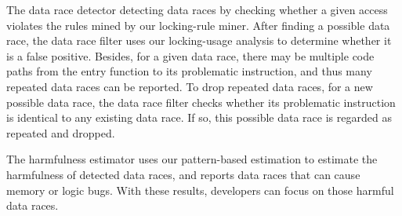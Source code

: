  The data race 
detector detecting data races by checking whether a given access violates the 
rules mined by our locking-rule miner. After finding a possible data race, the 
data race filter uses our locking-usage analysis to determine whether it is a 
false positive. Besides, for a given data race, there may be multiple code 
paths from the entry function to its problematic instruction, and thus many 
repeated data races can be reported. To drop repeated data races, for a new 
possible data race, the data race filter checks whether its problematic 
instruction is identical to any existing data race. If so, this possible data 
race is regarded as repeated and dropped.

 The harmfulness estimator uses our 
pattern-based estimation to estimate the harmfulness of detected data races, 
and reports data races that can cause memory or logic bugs. With these results, 
developers can focus on those harmful data races.